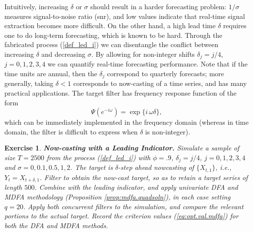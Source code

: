 \documentclass[a4paper]{book}
\newtheorem{Exercise}{Exercise}
\begin{document}
Intuitively, increasing $\delta$ or $\sigma$ should result in a harder forecasting
 problem: $1/ \sigma$ measures signal-to-noise ratio (snr), and low values indicate
 that real-time signal extraction becomes more difficult.  On the other hand,
 a high lead time $\delta$ requires one to do long-term forecasting, which is
 known to be hard.
 Through the fabricated  process (\ref{def_led_i}) we can disentangle the conflict
 between increasing $\delta$ and decreasing $\sigma$.
  By allowing for  non-integer shifts $\delta_j=j/4$, $j=0,1,2,3,4$
 we can quantify real-time forecasting performance.  Note
 that if the time units are annual, then the $\delta_j$ correspond to quarterly
 forecasts; more generally, taking $\delta < 1$ corresponds to now-casting
 of a time series, and has many practical applications.
  The target filter has frequency response function of the form
\[
 \Psi (e^{-i \omega}) = \exp \{ i \, \omega \delta \},
\]
 which can be immediately   implemented in the frequency domain
 (whereas in time domain, the filter is difficult to express
 when $\delta$ is non-integer).
 

\begin{Exercise} {\bf Now-casting with a Leading Indicator.} \rm
\label{exer:nowmdfa-udfa}
 Simulate a sample of size $T=2500$ from the process (\ref{def_led_i}) with
 $\phi = .9$, $\delta_j=j/4$, $j=0,1,2,3,4$ and 
$\sigma = 0,0.1,0.5,1,2$.  The target is $\delta$-step
 ahead nowcasting of $\{ X_{t,1} \}$, i.e., $Y_t = X_{t+\delta,1}$.
 Filter to obtain the now-cast target, so as to retain a target series
 of length $500$.  Combine with the leading indicator, and 
  apply univariate DFA and MDFA methodology (Proposition \ref{prop:mdfa.quadsoln}),
 in each case setting $q=20$.  
  Apply both concurrent filters 
 to the simulation, and compare the relevant portions to the actual
 target.  Record the criterion values  (\ref{eq:opt.val.mdfa})
 for both the DFA and MDFA methods.
\end{Exercise}
\end{document}
